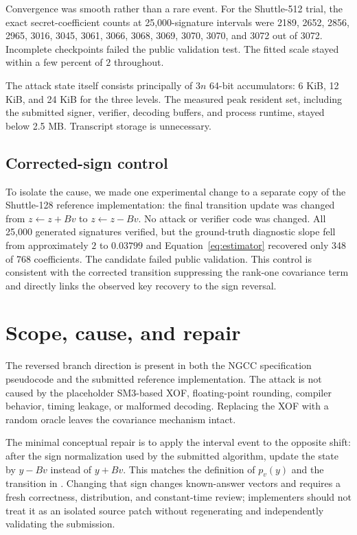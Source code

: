 \documentclass[11pt,a4paper]{article}
\begin{document}
Convergence was smooth rather than a rare event.  For the Shuttle-512 trial,
the exact secret-coefficient counts at 25,000-signature intervals were
2189, 2652, 2856, 2965, 3016, 3045, 3061, 3066, 3068, 3069, 3070, 3070, and
3072 out of 3072.  Incomplete checkpoints failed the public validation
test.  The fitted scale stayed within a few percent of $2$ throughout.

The attack state itself consists principally of $3n$ 64-bit accumulators:
6 KiB, 12 KiB, and 24 KiB for the three levels.  The measured peak resident
set, including the submitted signer, verifier, decoding buffers, and process
runtime, stayed below 2.5 MB.  Transcript storage is unnecessary.

\subsection{Corrected-sign control}
\label{sec:corrected-control}

To isolate the cause, we made one experimental change to a separate copy of
the Shuttle-128 reference implementation: the final transition update was
changed from $z\leftarrow z+Bv$ to $z\leftarrow z-Bv$.  No attack or verifier
code was changed.  All 25,000 generated signatures verified, but the
ground-truth diagnostic slope fell from approximately $2$ to $0.03799$ and
Equation~\eqref{eq:estimator} recovered only 348 of 768 coefficients.  The
candidate failed public validation.  This control is consistent with the
corrected transition suppressing the rank-one covariance term and directly
links the observed key recovery to the sign reversal.

\section{Scope, cause, and repair}
\label{sec:scope}

The reversed branch direction is present in both the NGCC specification
pseudocode and the submitted reference implementation.  The attack is not
caused by the placeholder SM3-based XOF, floating-point rounding, compiler
behavior, timing leakage, or malformed decoding.  Replacing the XOF with a
random oracle leaves the covariance mechanism intact.

The minimal conceptual repair is to apply the interval event to the opposite
shift: after the sign normalization used by the submitted algorithm, update
the state by $y-Bv$ instead of $y+Bv$.  This matches the definition of
$p_v(y)$ and the transition in \cite{MingEtAl}.  Changing that sign changes
known-answer vectors and requires a fresh correctness, distribution, and
constant-time review; implementers should not treat it as an isolated source
patch without regenerating and independently validating the submission.
\end{document}
